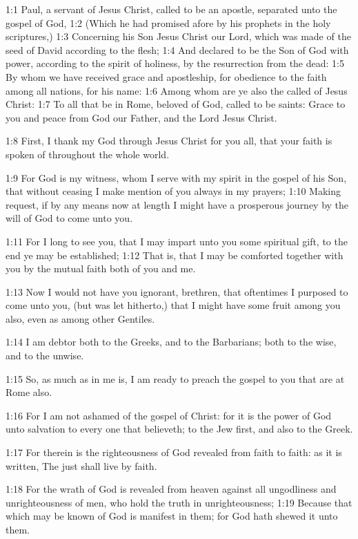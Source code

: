 

1:1 Paul, a servant of Jesus Christ, called to be an apostle, separated unto the gospel of God, 1:2 (Which he had promised afore by his prophets in the holy scriptures,) 1:3 Concerning his Son Jesus Christ our Lord, which was made of the seed of David according to the flesh; 1:4 And declared to be the Son of God with power, according to the spirit of holiness, by the resurrection from the dead: 1:5 By whom we have received grace and apostleship, for obedience to the faith among all nations, for his name: 1:6 Among whom are ye also the called of Jesus Christ: 1:7 To all that be in Rome, beloved of God, called to be saints: Grace to you and peace from God our Father, and the Lord Jesus Christ.

1:8 First, I thank my God through Jesus Christ for you all, that your faith is spoken of throughout the whole world.

1:9 For God is my witness, whom I serve with my spirit in the gospel of his Son, that without ceasing I make mention of you always in my prayers; 1:10 Making request, if by any means now at length I might have a prosperous journey by the will of God to come unto you.

1:11 For I long to see you, that I may impart unto you some spiritual gift, to the end ye may be established; 1:12 That is, that I may be comforted together with you by the mutual faith both of you and me.

1:13 Now I would not have you ignorant, brethren, that oftentimes I purposed to come unto you, (but was let hitherto,) that I might have some fruit among you also, even as among other Gentiles.

1:14 I am debtor both to the Greeks, and to the Barbarians; both to the wise, and to the unwise.

1:15 So, as much as in me is, I am ready to preach the gospel to you that are at Rome also.

1:16 For I am not ashamed of the gospel of Christ: for it is the power of God unto salvation to every one that believeth; to the Jew first, and also to the Greek.

1:17 For therein is the righteousness of God revealed from faith to faith: as it is written, The just shall live by faith.

1:18 For the wrath of God is revealed from heaven against all ungodliness and unrighteousness of men, who hold the truth in unrighteousness; 1:19 Because that which may be known of God is manifest in them; for God hath shewed it unto them.

